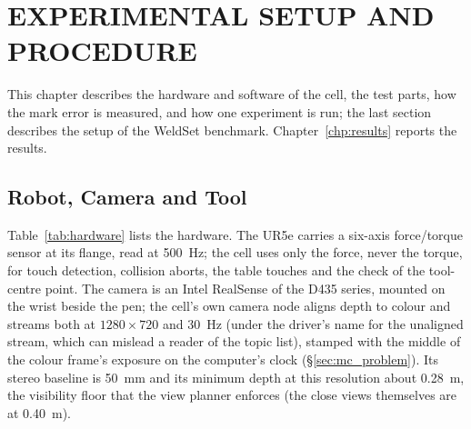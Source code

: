 \chapter{EXPERIMENTAL SETUP AND PROCEDURE}
\label{chp:setup}

This chapter describes the hardware and software of the cell, the test parts, how the mark error
is measured, and how one experiment is run; the last section describes the setup of the WeldSet
benchmark. Chapter~\ref{chp:results} reports the results.

\section{Robot, Camera and Tool}
\label{sec:setup_robot}
Table~\ref{tab:hardware} lists the hardware. The UR5e carries a six-axis force/torque sensor at
its flange, read at 500~Hz; the cell uses only the force, never the torque, for touch detection,
collision aborts, the table touches and the check of the tool-centre point. The camera is an Intel
RealSense of the D435 series, mounted on the wrist beside the pen; the cell's own camera node aligns
depth to colour and streams both at $1280\times720$ and 30~Hz (under the driver's name for the
unaligned stream, which can mislead a reader of the topic list), stamped with the middle of the
colour frame's exposure on the computer's clock (\S\ref{sec:mc_problem}). Its stereo baseline is 50~mm and its
minimum depth at this resolution about 0.28~m, the visibility floor that the view planner enforces
(the close views themselves are at 0.40~m).

